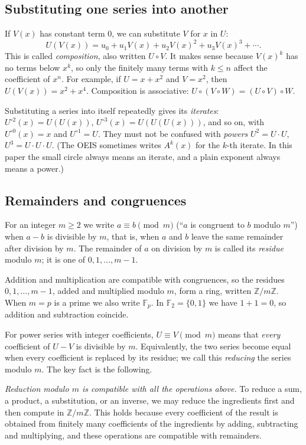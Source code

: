 \documentclass[11pt,a4paper]{article}
\theoremstyle{definition}
\theoremstyle{remark}
\newcommand{\Z}{\mathbb{Z}}
\newcommand{\F}{\mathbb{F}}
\begin{document}
\subsection{Substituting one series into another}
If $V(x)$ has constant term $0$, we can substitute $V$ for $x$ in $U$:
\[
U(V(x))=u_0+u_1V(x)+u_2V(x)^2+u_3V(x)^3+\cdots .
\]
This is called \emph{composition}, also written $U\circ V$. It makes sense because $V(x)^k$ has no terms below $x^k$,
so only the finitely many terms with $k\le n$ affect the coefficient of $x^n$. For example, if $U=x+x^2$ and $V=x^2$, then
$U(V(x))=x^2+x^4$. Composition is associative: $U\circ(V\circ W)=(U\circ V)\circ W$.

Substituting a series into itself repeatedly gives its \emph{iterates}: $U^{\circ2}(x)=U(U(x))$,
$U^{\circ3}(x)=U(U(U(x)))$, and so on, with $U^{\circ0}(x)=x$ and $U^{\circ1}=U$. They must not be confused with
\emph{powers} $U^2=U\cdot U$, $U^3=U\cdot U\cdot U$. (The OEIS sometimes writes $A^k(x)$ for the $k$-th iterate. In
this paper the small circle always means an iterate, and a plain exponent always means a power.)

\subsection{Remainders and congruences}
For an integer $m\ge2$ we write $a\equiv b\pmod m$ (``$a$ is congruent to $b$ modulo $m$'') when $a-b$ is divisible by
$m$, that is, when $a$ and $b$ leave the same remainder after division by $m$. The remainder of $a$ on division by
$m$ is called its \emph{residue} modulo $m$; it is one of $0,1,\dots,m-1$.

Addition and multiplication are compatible with congruences, so the residues $0,1,\dots,m-1$, added and multiplied
modulo $m$, form a ring, written $\Z/m\Z$. When $m=p$ is a prime we also write $\F_p$. In $\F_2=\{0,1\}$ we have $1+1=0$,
so addition and subtraction coincide.

For power series with integer coefficients, $U\equiv V\pmod m$ means that \emph{every} coefficient of $U-V$ is
divisible by $m$. Equivalently, the two series become equal when every coefficient is replaced by its residue; we call
this \emph{reducing} the series modulo $m$. The key fact is the following.

\emph{Reduction modulo $m$ is compatible with all the operations above.} To reduce a sum, a product, a substitution, or
an inverse, we may reduce the ingredients first and then compute in $\Z/m\Z$. This holds because every
coefficient of the result is obtained from finitely many coefficients of the ingredients by adding, subtracting and
multiplying, and these operations are compatible with remainders.
\end{document}
